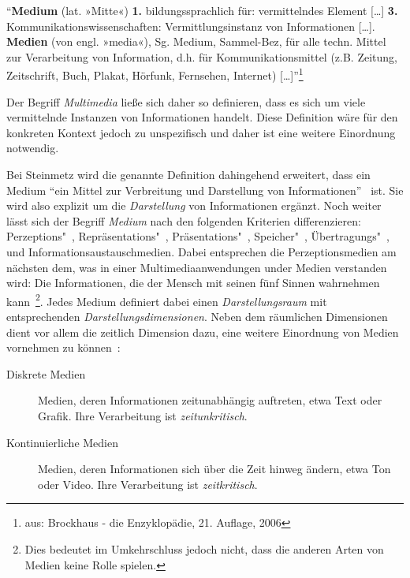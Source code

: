   \begin{definition}\label{def:medium}
    "`\textbf{Medium} (lat. »Mitte«) \textbf{1.} bildungssprachlich für: vermittelndes Element [\ldots] \textbf{3.} Kommunikationswissenschaften: Vermittlungsinstanz von Informationen [\ldots]. \textbf{Medien} (von engl. »media«), Sg. Medium, Sammel-Bez, für alle techn. Mittel zur Verarbeitung von Information, d.h. für Kommunikationsmittel (z.B. Zeitung, Zeitschrift, Buch, Plakat, Hörfunk, Fernsehen, Internet) [\ldots]"'\footnote{aus: Brockhaus - die Enzyklopädie, 21. Auflage, 2006}
  \end{definition}
  
  Der Begriff \emph{Multimedia} ließe sich daher so definieren, dass es sich um viele vermittelnde Instanzen von Informationen handelt. Diese Definition wäre für den konkreten Kontext jedoch zu unspezifisch und daher ist eine weitere Einordnung notwendig.
  
  Bei Steinmetz wird die genannte Definition dahingehend erweitert, dass ein Medium "`ein Mittel zur Verbreitung und Darstellung von Informationen"'~\citep[S. 7]{multimedia_technologie} ist. Sie wird also explizit um die \emph{Darstellung} von Informationen ergänzt. Noch weiter lässt sich der Begriff \emph{Medium} nach den folgenden Kriterien differenzieren: Perzeptions"~, Repräsentations"~, Präsentations"~, Speicher"~, Übertragungs"~, und Informationsaustauschmedien. Dabei entsprechen die Perzeptionsmedien am nächsten dem, was in einer Multimediaanwendungen under Medien verstanden wird: Die Informationen, die der Mensch mit seinen fünf Sinnen wahrnehmen kann~\citep[S. 9]{multimedia_technologie}\footnote{Dies bedeutet im Umkehrschluss jedoch nicht, dass die anderen Arten von Medien keine Rolle spielen.}. Jedes Medium definiert dabei einen \emph{Darstellungsraum} mit entsprechenden \emph{Darstellungsdimensionen}. Neben dem räumlichen Dimensionen dient vor allem die zeitlich Dimension dazu, eine weitere Einordnung von Medien vornehmen zu können~\citep[S. 10]{multimedia_technologie}:
  
  \begin{description}
    \item[Diskrete Medien] Medien, deren Informationen zeitunabhängig auftreten, etwa Text oder Grafik. Ihre Verarbeitung ist \emph{zeitunkritisch}.
    \item[Kontinuierliche Medien] Medien, deren Informationen sich über die Zeit hinweg ändern, etwa Ton oder Video. Ihre Verarbeitung ist \emph{zeitkritisch}.
  \end{description}

